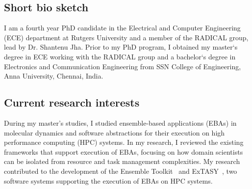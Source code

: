 \subsection{Short bio sketch}
I am a fourth year PhD candidate in the Electrical and Computer Engineering (ECE)
department at Rutgers University and a member of the RADICAL group, lead by 
Dr. Shantenu Jha. Prior to my PhD program, I obtained my master`s degree in ECE 
working with the RADICAL group and a bachelor`s degree in Electronics and 
Communication Engineering from SSN College of Engineering, Anna University, 
Chennai, India.


\subsection{Current research interests} During my master's studies, I 
studied ensemble-based applications (EBAs) in molecular dynamics and 
software abstractions for their execution on high performance computing 
(HPC) systems. In my research, I reviewed the existing frameworks that 
support execution of EBAs, focusing on how domain scientists can be 
isolated from resource and task management complexities. My research 
contributed to the development of the Ensemble Toolkit~\cite{entk} and 
ExTASY~\cite{extasy}, two software systems supporting the execution of 
EBAs on HPC systems.

